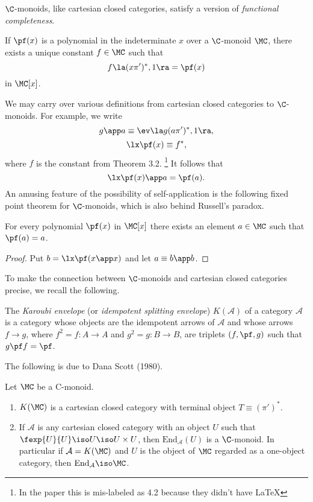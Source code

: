 $\C$-monoids, like cartesian closed categories, satisfy a version of
{\em functional completeness}.

\begin{thm}
If $\pf(x)$ is a polynomial in the indeterminate $x$ over a
$\C$-monoid $\MC$, there exists a unique constant $f\in \MC$ such that
\[
f\la (x\pi')^*, 1 \ra = \pf(x)
\]
in $\MC[x]$.
\end{thm}
We may carry over various definitions from cartesian closed categories
to $\C$-monoids. For example, we write
\[
g\app a \equiv \ev \la g(a \pi')^*,1\ra,
\]
\[
\lx \pf(x) \equiv f^*,
\]
where $f$ is the constant from Theorem 3.2.%
\footnote{In the paper this is mis-labeled as 4.2 because they didn't have \LaTeX}
It follows that
\[
\lx \pf(x) \app a = \pf(a).
\]
An amusing feature of the possibility of self-application is the
following fixed point theorem for $\C$-monoids, which is also behind Russell's
paradox.

\begin{prop}
For every polynomial $\pf(x)$ in $\MC[x]$ there exists an
element $a \in \MC$ such that $\pf(a) = a$.
\end{prop}

\begin{proof}
Put $b = \lx \pf(x \app x)$ and let $a \equiv b \app b$.
\end{proof}

To make the connection between $\C$-monoids and cartesian closed categories
precise, we recall the following.

\begin{defn}
The {\em Karoubi envelope} (or {\em idempotent splitting envelope})
$K(\mathcal A)$ of a category $\mathcal A$ is a category whose objects
are the idempotent arrows of $\mathcal A$ and whose arrows $f \to g$, where
$f^2 = f: A \to A$ and $g^2 = g: B \to B$, are triplets
$(f, \pf, g)$ such that $g\pf f = \pf$.
\end{defn}

The following is due to Dana Scott (1980).

\begin{thm}
Let $\MC$ be a C-monoid.
\begin{enumerate}[label=(\roman*)]
\item $K(\MC)$ is a cartesian closed category  with terminal object
$T \equiv (\pi')^*$.
\item If $\mathcal A$ is any cartesian closed category with an object $U$
such that $\fexp{U}{U} \iso U \iso U \times U$, then $\text{End}_{\mathcal A}(U)$
is a $\C$-monoid. In particular if ${\mathcal A} = K(\MC)$
and $U$ is the object of $\MC$
regarded as a one-object category, then $\text{End}_{\mathcal A} \iso \MC$.
\end{enumerate}
\end{thm}

